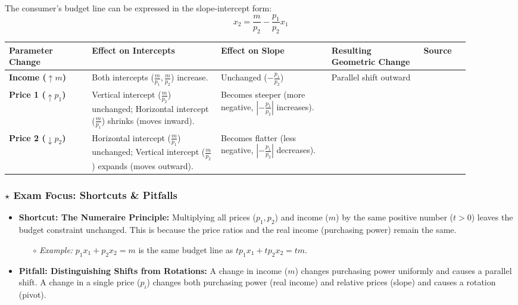 \documentclass{article}
\begin{document}
The consumer's budget line can be expressed in the slope-intercept form: \[ x_2 = \frac{m}{p_2} - \frac{p_1}{p_2} x_1 \]

\centering
\begin{tabular}{>{\raggedright\arraybackslash}p{0.18\linewidth} >{\raggedright\arraybackslash}p{0.28\linewidth} >{\raggedright\arraybackslash}p{0.24\linewidth} >{\raggedright\arraybackslash}p{0.20\linewidth} p{0cm}}
\toprule
\textbf{Parameter Change}& \textbf{Effect on Intercepts}& \textbf{Effect on Slope}& \textbf{Resulting Geometric Change}& \textbf{Source} \\
\midrule
\textbf{Income ($\uparrow m$)}&  Both intercepts ($\frac{m}{p_1}, \frac{m}{p_2}$) increase.& Unchanged ($-\frac{p_1}{p_2}$)& Parallel shift outward&   \\ \addlinespace
\textbf{Price 1 ($\uparrow p_1$)}&  Vertical intercept ($\frac{m}{p_2}$) unchanged; Horizontal intercept ($\frac{m}{p_1}$) shrinks (moves inward).& Becomes steeper (more negative, $| -\frac{p_1}{p_2}| $ increases). & & \\ \addlinespace
\textbf{Price 2 ($\downarrow p_2$)}&  Horizontal intercept ($\frac{m}{p_1}$) unchanged; Vertical intercept ($\frac{m}{p_2}$) expands (moves outward).& Becomes flatter (less negative, $| -\frac{p_1}{p_2}| $ decreases). & & \\
\bottomrule
\end{tabular}

\subsubsection*{$\star$ Exam Focus: Shortcuts \& Pitfalls}
\begin{itemize}
    \item \textbf{Shortcut: The Numeraire Principle:} Multiplying all prices ($p_1, p_2$) and income ($m$) by the same positive number ($t > 0$) leaves the budget constraint unchanged. This is because the price ratios and the real income (purchasing power) remain the same.
    \begin{itemize}
        \item[$\circ$] \textit{Example:} $p_1 x_1 + p_2 x_2 = m$ is the same budget line as $tp_1 x_1 + tp_2 x_2 = tm$.
    \end{itemize}
    \item \textbf{Pitfall: Distinguishing Shifts from Rotations:} A change in income ($m$) changes purchasing power uniformly and causes a parallel shift. A change in a single price ($p_i$) changes both purchasing power (real income) and relative prices (slope) and causes a rotation (pivot).
\end{itemize}
\end{document}

